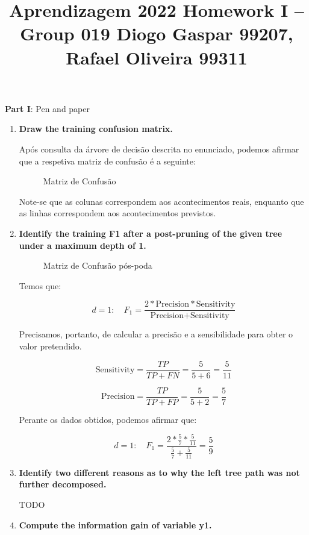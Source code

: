 \documentclass[12pt]{article}
\title{\large{Aprendizagem 2022}\vskip 0.2cm Homework I -- Group 019\vskip 0.2cm Diogo Gaspar 99207, Rafael Oliveira 99311}
\date{}
\begin{document}
\maketitle
\center\large{\vskip -2.5cm\textbf{Part I}: Pen and paper}
\begin{enumerate}[leftmargin=\labelsep]
\item \textbf{Draw the training confusion matrix.}

Após consulta da árvore de decisão descrita no enunciado, podemos afirmar que
a respetiva matriz de confusão é a seguinte:

\begin{figure}[htpb]
  \centering
  
  \caption{Matriz de Confusão}
\end{figure}

Note-se que as colunas correspondem aos acontecimentos reais, enquanto que as
linhas correspondem aos acontecimentos previstos.

\item \textbf{Identify the training F1 after a post-pruning of the given tree under a maximum depth of 1.}

\begin{figure}[htpb]
\centering

\caption{Matriz de Confusão pós-poda}
\end{figure}

Temos que:

$$
d = 1: \quad F_1 = \frac{2 * \text{Precision} * \text{Sensitivity}}{\text{Precision} + \text{Sensitivity}}
$$

Precisamos, portanto, de calcular a precisão e a sensibilidade para obter o valor pretendido.

$$
\text{Sensitivity} = \frac{TP}{TP + FN} = \frac{5}{5 + 6} = \frac{5}{11}
$$

$$
\text{Precision} = \frac{TP}{TP + FP}= \frac{5}{5 + 2} = \frac{5}{7}
$$

Perante os dados obtidos, podemos afirmar que:

$$
d = 1: \quad F_1 = \frac{2 * \frac{5}{7} * \frac{5}{11}}{\frac{5}{7} + \frac{5}{11}} = \frac{5}{9}
$$

\item \textbf{Identify two different reasons as to why the left tree path was not further decomposed.}

TODO

\item \textbf{Compute the information gain of variable y1.}


\end{enumerate}
\end{document}
